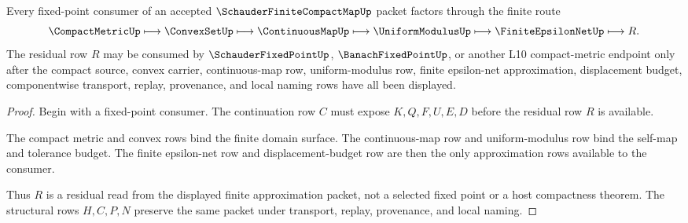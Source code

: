 \begin{theorem}
\label{thm:schauder-finite-compact-map-residual-route}
Every fixed-point consumer of an accepted $\SchauderFiniteCompactMapUp$ packet factors through the finite route
$$
\CompactMetricUp \longmapsto
\ConvexSetUp \longmapsto
\ContinuousMapUp \longmapsto
\UniformModulusUp \longmapsto
\FiniteEpsilonNetUp \longmapsto
R .
$$
The residual row $R$ may be consumed by $\SchauderFixedPointUp$, $\BanachFixedPointUp$, or another L10 compact-metric endpoint only after the compact source, convex carrier, continuous-map row, uniform-modulus row, finite epsilon-net approximation, displacement budget, componentwise transport, replay, provenance, and local naming rows have all been displayed.
\end{theorem}
\begin{proof}
Begin with a fixed-point consumer. The continuation row $C$ must expose $K,Q,F,U,E,D$ before the residual row $R$ is available.

The compact metric and convex rows bind the finite domain surface. The continuous-map row and uniform-modulus row bind the self-map and tolerance budget. The finite epsilon-net row and displacement-budget row are then the only approximation rows available to the consumer.

Thus $R$ is a residual read from the displayed finite approximation packet, not a selected fixed point or a host compactness theorem. The structural rows $H,C,P,N$ preserve the same packet under transport, replay, provenance, and local naming.
\end{proof}




